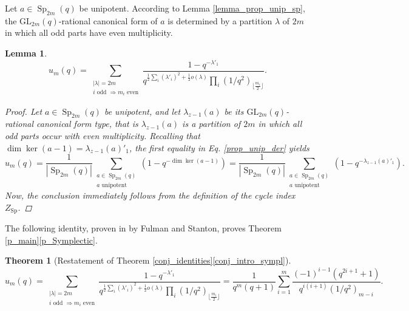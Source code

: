 \documentclass[a4paper, 12pt, oneside]{amsart}
\newtheorem*{thm*}{Theorem}
\newtheorem{lemma}[prop]{Lemma}
\theoremstyle{definition}
\newcommand{\GL}{\mathrm{GL}}
\DeclareMathOperator{\Sp}{Sp}
\begin{document}
Let $a \in \Sp_{2m}(q)$ be unipotent. According to Lemma \ref{lemma_prop_unip_sp}, the $\GL_{2m}(q)$-rational canonical form of $a$ is determined by a partition $\lambda$ of $2m$ in which all odd parts have even multiplicity.

\begin{lemma}
\label{lemma_p_sympl}
$$u_m(q)=\sum_{\substack{|\lambda|=2m\\ i \text{ odd }\Rightarrow m_i \text{ even}}}\frac{1-q^{-\lambda'_1}}{q^{\frac{1}{2}\sum_i(\lambda'_i)^2+\frac{1}{2}o(\lambda)}\prod_i(1/q^2)_{\lfloor\frac{m_i}{2}\rfloor}}.$$
\begin{proof} Let $a\in \Sp_{2m}(q)$ be unipotent, and let $\lambda_{z-1}(a)$ be its $\GL_{2m}(q)$-rational canonical form type, that is $\lambda_{z-1}(a)$ is a partition of $2m$ in which all odd parts occur with even multiplicity.
Recalling that $\dim \ker(a-1)=\lambda_{z-1}(a)'_1$, the first equality in Eq. \eqref{prop_unip_der} yields
$$u_m(q)=\frac{1}{|\Sp_{2m}(q)|}\sum_{\substack{a \in \Sp_{2m}(q)\\a \text{ unipotent}}}\left(1-q^{-\dim \ker(a-1)}\right)=\frac{1}{|\Sp_{2m}(q)|}\sum_{\substack{a \in \Sp_{2m}(q)\\a \text{ unipotent}}}\left(1-q^{-\lambda_{z-1}(a)'_1}\right) .$$
Now, the conclusion immediately follows from the definition of the cycle index $Z_{\Sp}$. 
\end{proof}
\end{lemma}

The following identity, proven in \cite{FulmanStanton25}  by Fulman and Stanton, proves Theorem \ref{p_main}\eqref{p_Symplectic}.
\begin{thm*}[Restatement of Theorem \ref{conj_identities}\eqref{conj_intro_sympl}]
$$u_m(q)=\sum_{\substack{|\lambda|=2m\\ i \text{ odd }\Rightarrow m_i \text{ even}}}\frac{1-q^{-\lambda'_1}}{q^{\frac{1}{2}\sum_i(\lambda'_i)^2+\frac{1}{2}o(\lambda)}\prod_i(1/q^2)_{\lfloor\frac{m_i}{2}\rfloor}}=
\frac{1}{q^m(q+1)}\sum_{i=1}^{m}\frac{(-1)^{i-1}(q^{2i+1}+1)}{q^{i(i+1)}(1/q^2)_{m-i}}.
$$
\end{thm*}
\end{document}
